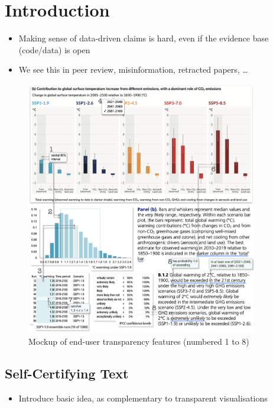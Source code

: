 \section{Introduction}

\begin{itemize}
\item Making sense of data-driven claims is hard, even if the evidence base (code/data) is open
\item We see this in peer review, misinformation, retracted papers, …
\end{itemize}

\begin{figure}[h]
   \includegraphics[width=0.9\textwidth]{fig/ipcc-mockup.png}
   \caption{Mockup of end-user transparency features (numbered 1 to 8)}
   \label{fig:ipcc-mockup}
\end{figure}

\subsection{Self-Certifying Text}

\begin{itemize}
\item Introduce basic idea, as complementary to transparent visualisations
\end{itemize}


